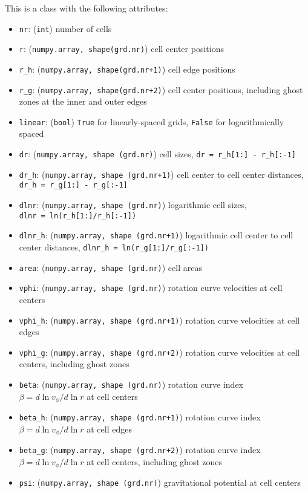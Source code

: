 \documentclass[12pt]{article}
\begin{document}
This is a class with the following attributes:
\begin{itemize}
\item \verb=nr=: (\verb=int=) number of cells
\item \verb=r=: (\verb=numpy.array, shape(grd.nr)=) cell center positions
\item \verb=r_h=: (\verb=numpy.array, shape(grd.nr+1)=) cell edge positions
\item \verb=r_g=: (\verb=numpy.array, shape(grd.nr+2)=) cell center positions, including ghost zones at the inner and outer edges
\item \verb=linear=: (\verb=bool=) \verb=True= for linearly-spaced grids, \verb=False= for logarithmically spaced
\item \verb=dr=: (\verb=numpy.array, shape (grd.nr)=) cell sizes, \verb!dr = r_h[1:] - r_h[:-1]!
\item \verb=dr_h=: (\verb=numpy.array, shape (grd.nr+1)=) cell center to cell center distances, \\ \verb!dr_h = r_g[1:] - r_g[:-1]!
\item \verb=dlnr=: (\verb=numpy.array, shape (grd.nr)=) logarithmic cell sizes,\\ \verb!dlnr = ln(r_h[1:]/r_h[:-1])!
\item \verb=dlnr_h=: (\verb=numpy.array, shape (grd.nr+1)=) logarithmic cell center to cell center distances, \verb!dlnr_h = ln(r_g[1:]/r_g[:-1])!
\item \verb=area=: (\verb=numpy.array, shape (grd.nr)=) cell areas
\item \verb=vphi=: (\verb=numpy.array, shape (grd.nr)=) rotation curve velocities at cell centers
\item \verb=vphi_h=: (\verb=numpy.array, shape (grd.nr+1)=) rotation curve velocities at cell edges
\item \verb=vphi_g=: (\verb=numpy.array, shape (grd.nr+2)=) rotation curve velocities at cell centers, including ghost zones
\item \verb=beta=: (\verb=numpy.array, shape (grd.nr)=) rotation curve index $\beta=d\ln v_\phi/d\ln r$ at cell centers
\item \verb=beta_h=: (\verb=numpy.array, shape (grd.nr+1)=) rotation curve index $\beta=d\ln v_\phi/d\ln r$ at cell edges
\item \verb=beta_g=: (\verb=numpy.array, shape (grd.nr+2)=) rotation curve index $\beta=d\ln v_\phi/d\ln r$ at cell centers, including ghost zones
\item \verb=psi=: (\verb=numpy.array, shape (grd.nr)=) gravitational potential at cell centers

\end{itemize}
\end{document}
